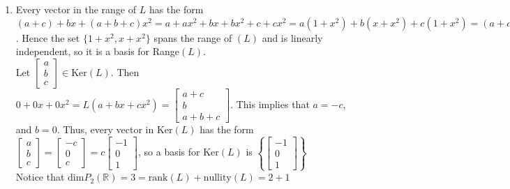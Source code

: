 \documentclass[10pt,english]{article}
\begin{document}
\begin{enumerate}
\begin{enumerate}
    \item  Every vector in the range of $L$ has the form $(a+c)+bx+(a+b+c)x^2=a+ax^2+bx+bx^2+c+cx^2=a(1+x^2)+b(x+x^2)+c(1+x^2)=(a+c)(1+x^2)+b(x+x^2)$. Hence the set $\{1+x^2,x+x^2\}$ spans the range of $(L)$ and is linearly independent, so it is a basis for Range$(L)$. \\ 
    Let $\begin{bmatrix}a\\b\\c\end{bmatrix}\in\text{Ker}(L)$. Then $0+0x+0x^2=L(a+bx+cx^2)=\begin{bmatrix}a+c\\b\\a+b+c\end{bmatrix}$. This implies that $a=-c$, and $b=0$. Thus, every vector in Ker$(L)$ has the form $\begin{bmatrix}a\\b\\c\end{bmatrix}=\begin{bmatrix}-c\\0\\c\end{bmatrix}=c\begin{bmatrix}-1\\0\\1\end{bmatrix}$, so a basis for Ker$(L)$ is $\left\{\begin{bmatrix}-1\\0\\1\end{bmatrix}\right\}$ \\ 
    Notice that $\text{dim}P_2(\mathbb{R})=3=\text{rank}(L)+\text{nullity}(L)=2+1$
    
    
\end{enumerate}


\end{enumerate}
\end{document}
